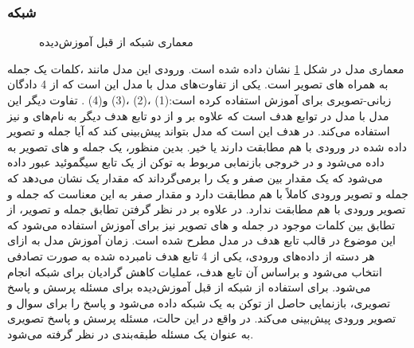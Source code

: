 \subsubsection{شبکه }
	\begin{figure}
		\caption[معماری شبکه از قبل آموزش‌دیده]{معماری شبکه از قبل آموزش‌دیده \cite{chen2020uniter}}
		\label{fig:UNITER}
	\end{figure}
	معماری مدل 
	در شکل
	\ref{fig:UNITER}
	نشان داده شده است. ورودی این مدل مانند
	،کلمات یک جمله به همراه 
	های تصویر است. یکی از تفاوت‌های مدل 
	با مدل 
	این است که از 4 ‌دادگان زبانی-تصویری برای آموزش استفاده کرده است:(1)
	،(2)
	،(3)
	و(4)
	.
	تفاوت دیگر این مدل با مدل
	در توابع هدف است که علاوه بر
	و
	از دو تابع هدف دیگر به نام‌های
	و 
	نیز استفاده می‌کند. در
	هدف این است که مدل بتواند پیش‌بینی کند که آیا جمله و تصویر داده شده در ورودی با هم مطابقت دارند یا خیر. بدین منظور، یک جمله و 
	های تصویر به 
	داده می‌شود و در خروجی بازنمابی مربوط به توکن 
	\lr{[CLS]}
	از یک تابع سیگموئید عبور داده می‌شود که یک مقدار بین صفر و یک را برمی‌گرداند که مقدار یک نشان می‌دهد که جمله و تصویر ورودی کاملاً با هم مطابقت دارد و مقدار صفر به این معناست که جمله و تصویر ورودی با هم مطابقت ندارد. در 
	علاوه بر ‌در نظر گرفتن تطابق جمله و تصویر، از تطابق بین کلمات موجود در جمله و 
	های تصویر نیز برای آموزش استفاده می‌شود که این موضوع در قالب تابع هدف 
	در مدل مطرح شده است. زمان آموزش مدل 
	به ازای هر دسته از داده‌های ورودی، یکی از 4 تابع هدف نامبرده شده به صورت تصادفی انتخاب می‌شود و براساس آن تابع هدف، عملیات کاهش گرادیان برای شبکه انجام ‌می‌شود. برای استفاده از شبکه از قبل آموزش‌دیده
	برای مسئله پرسش و پاسخ تصویری، بازنمایی حاصل از توکن
	\lr{[CLS]}
	به یک شبکه 
	داده می‌شود و پاسخ را برای سوال و تصویر ورودی پیش‌بینی می‌کند. در واقع در این حالت، مسئله پرسش و پاسخ تصویری به عنوان یک مسئله طبقه‌بندی در نظر گرفته می‌شود.
	
